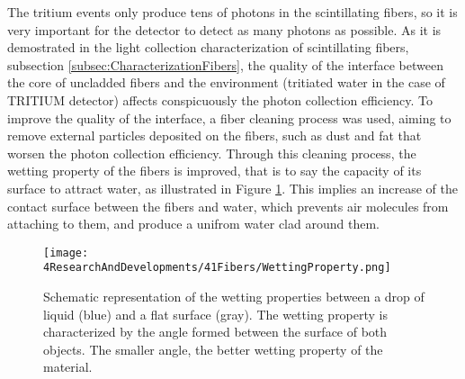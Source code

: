 
The tritium events only produce tens of photons in the scintillating fibers, so it is very important for the detector to detect as many photons as possible. As it is demostrated in the light collection characterization of scintillating fibers, subsection \ref{subsec:CharacterizationFibers}, the quality of the interface between the core of uncladded fibers and the environment (tritiated water in the case of TRITIUM detector) affects conspicuously the photon collection efficiency. To improve the quality of the interface, a fiber cleaning process was used, aiming to remove external particles deposited on the fibers, such as dust and fat that worsen the photon collection efficiency.  Through this cleaning process, the wetting property of the fibers is improved, that is to say the capacity of its surface to attract water, as illustrated in Figure \ref{fig:WettingProperty}. This implies an increase of the contact surface between the fibers and water, which prevents air molecules from attaching to them, and produce a unifrom water clad around them.


\begin{figure}[h]
\centering
\texttt{[image: 4ResearchAndDevelopments/41Fibers/WettingProperty.png]}
\caption{Schematic representation of the wetting properties between a drop of liquid (blue) and a flat surface (gray). The wetting property is characterized by the angle formed between the surface of both objects. The smaller angle, the better wetting property of the material. \cite{WettingProperty}\label{fig:WettingProperty}}
\end{figure}

